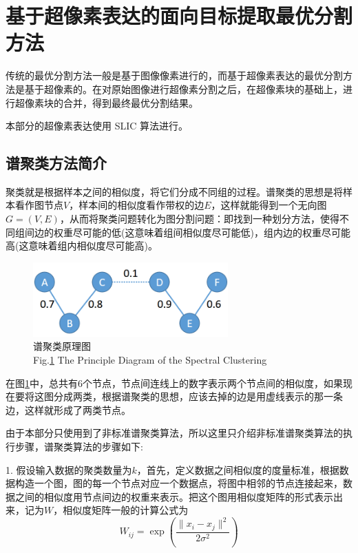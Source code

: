 \section{基于超像素表达的面向目标提取最优分割方法}

传统的最优分割方法一般是基于图像像素进行的，而基于超像素表达的最优分割方法是基于超像素的。在对原始图像进行超像素分割之后，在超像素块的基础上，进行超像素块的合并，得到最终最优分割结果。

本部分的超像素表达使用 SLIC 算法进行。

\subsection{谱聚类方法简介}

聚类就是根据样本之间的相似度，将它们分成不同组的过程。谱聚类的思想是将样本看作图节点$V$，样本间的相似度看作带权的边$E$，这样就能得到一个无向图$G=(V,E)$，从而将聚类问题转化为图分割问题：即找到一种划分方法，使得不同组间边的权重尽可能的低(这意味着组间相似度尽可能低)，组内边的权重尽可能高(这意味着组内相似度尽可能高)。


\begin{figure}[H]
\centering
\includegraphics[width=7.5cm]{figures/谱聚类原理图.png}
\captionsetup{justification=centering}
\caption{谱聚类原理图 \\ Fig.\ref{谱聚类原理图} The Principle Diagram of the Spectral Clustering}\label{谱聚类原理图}
\end{figure}

在图\ref{谱聚类原理图}中，总共有$6$个节点，节点间连线上的数字表示两个节点间的相似度，如果现在要将这图分成两类，根据谱聚类的思想，应该去掉的边是用虚线表示的那一条边，这样就形成了两类节点。

由于本部分只使用到了非标准谱聚类算法，所以这里只介绍非标准谱聚类算法的执行步骤，谱聚类算法的步骤如下:

1. 假设输入数据的聚类数量为$k$，首先，定义数据之间相似度的度量标准，根据数据构造一个图，图的每一个节点对应一个数据点，将图中相邻的节点连接起来，数据之间的相似度用节点间边的权重来表示。把这个图用相似度矩阵的形式表示出来，记为$W$，相似度矩阵一般的计算公式为
$$
W_{ij}=\exp{(\frac{\|x_i-x_j\|^2}{2\sigma^2})}
$$

